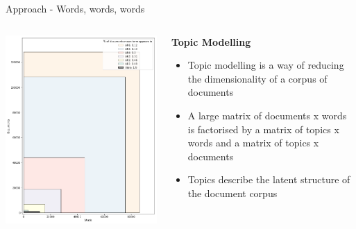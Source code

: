 \documentclass[9pt]{beamer}
\begin{document}
\begin{frame}{Approach - Words, words, words}

\begin{columns}
	\begin{column}{0.5\linewidth}
		\begin{center}
			\includegraphics[width=\linewidth]{../plots/volume_variety_bible_AR6}
		\end{center}
	\end{column}
	\begin{column}{0.5\linewidth}
		\textbf{Topic Modelling}
		\begin{center}
			\begin{itemize}
				\item Topic modelling is a way of reducing the dimensionality of a corpus of documents
				\item A large matrix of documents x words is factorised by
				a matrix of topics x words and a matrix of topics x documents
			\citep{Lee1999}
				\item Topics describe the latent structure of the document corpus
				
			\end{itemize}
		\end{center}
	\end{column}
\end{columns}

\end{frame}
\end{document}
